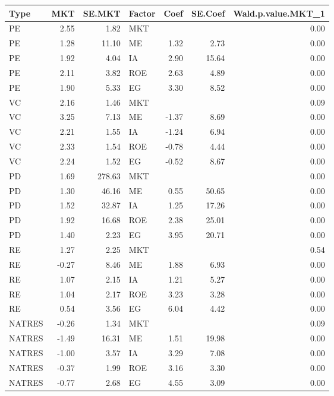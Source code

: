 \documentclass[12pt]{article}
\begin{document}
\begin{table}[ht]
	\centering
	\begin{tabular}{lrrlrrr}
		Type & MKT & SE.MKT & Factor & Coef & SE.Coef & Wald.p.value.MKT\_1 \\ 
		\hline
		\hline
		PE & 2.55 & 1.82 & MKT &  &  & 0.00 \\ 
		PE & 1.28 & 11.10 & ME & 1.32 & 2.73 & 0.00 \\ 
		PE & 1.92 & 4.04 & IA & 2.90 & 15.64 & 0.00 \\ 
		PE & 2.11 & 3.82 & ROE & 2.63 & 4.89 & 0.00 \\ 
		PE & 1.90 & 5.33 & EG & 3.30 & 8.52 & 0.00 \\ 
		\hline
		VC & 2.16 & 1.46 & MKT &  &  & 0.09 \\ 
		VC & 3.25 & 7.13 & ME & -1.37 & 8.69 & 0.00 \\ 
		VC & 2.21 & 1.55 & IA & -1.24 & 6.94 & 0.00 \\ 
		VC & 2.33 & 1.54 & ROE & -0.78 & 4.44 & 0.00 \\ 
		VC & 2.24 & 1.52 & EG & -0.52 & 8.67 & 0.00 \\ 
		\hline
		PD & 1.69 & 278.63 & MKT &  &  & 0.00 \\ 
		PD & 1.30 & 46.16 & ME & 0.55 & 50.65 & 0.00 \\ 
		PD & 1.52 & 32.87 & IA & 1.25 & 17.26 & 0.00 \\ 
		PD & 1.92 & 16.68 & ROE & 2.38 & 25.01 & 0.00 \\ 
		PD & 1.40 & 2.23 & EG & 3.95 & 20.71 & 0.00 \\ 
		\hline
		RE & 1.27 & 2.25 & MKT &  &  & 0.54 \\ 
		RE & -0.27 & 8.46 & ME & 1.88 & 6.93 & 0.00 \\ 
		RE & 1.07 & 2.15 & IA & 1.21 & 5.27 & 0.00 \\ 
		RE & 1.04 & 2.17 & ROE & 3.23 & 3.28 & 0.00 \\ 
		RE & 0.54 & 3.56 & EG & 6.04 & 4.42 & 0.00 \\ 
		\hline
		NATRES & -0.26 & 1.34 & MKT &  &  & 0.09 \\ 
		NATRES & -1.49 & 16.31 & ME & 1.51 & 19.98 & 0.00 \\ 
		NATRES & -1.00 & 3.57 & IA & 3.29 & 7.08 & 0.00 \\ 
		NATRES & -0.37 & 1.99 & ROE & 3.16 & 3.30 & 0.00 \\ 
		NATRES & -0.77 & 2.68 & EG & 4.55 & 3.09 & 0.00 \\ 

\end{tabular}
\end{table}
\end{document}
